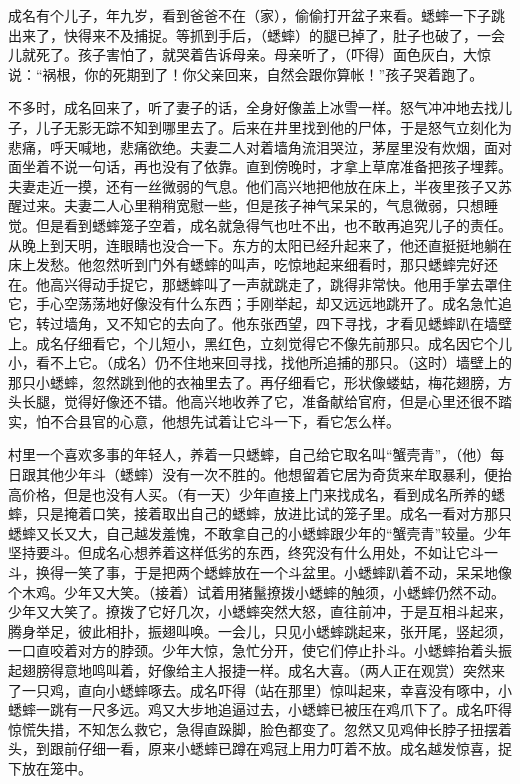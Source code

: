 \documentclass[12pt,UTF-8,openany]{ctexbook}
\begin{document}
\begin{normalsize}
    成名有个儿子，年九岁，看到爸爸不在（家），偷偷打开盆子来看。蟋蟀一下子跳出来了，快得来不及捕捉。等抓到手后，（蟋蟀）的腿已掉了，肚子也破了，一会儿就死了。孩子害怕了，就哭着告诉母亲。母亲听了，（吓得）面色灰白，大惊说：“祸根，你的死期到了！你父亲回来，自然会跟你算帐！”孩子哭着跑了。
    
    不多时，成名回来了，听了妻子的话，全身好像盖上冰雪一样。怒气冲冲地去找儿子，儿子无影无踪不知到哪里去了。后来在井里找到他的尸体，于是怒气立刻化为悲痛，呼天喊地，悲痛欲绝。夫妻二人对着墙角流泪哭泣，茅屋里没有炊烟，面对面坐着不说一句话，再也没有了依靠。直到傍晚时，才拿上草席准备把孩子埋葬。夫妻走近一摸，还有一丝微弱的气息。他们高兴地把他放在床上，半夜里孩子又苏醒过来。夫妻二人心里稍稍宽慰一些，但是孩子神气呆呆的，气息微弱，只想睡觉。但是看到蟋蟀笼子空着，成名就急得气也吐不出，也不敢再追究儿子的责任。从晚上到天明，连眼睛也没合一下。东方的太阳已经升起来了，他还直挺挺地躺在床上发愁。他忽然听到门外有蟋蟀的叫声，吃惊地起来细看时，那只蟋蟀完好还在。他高兴得动手捉它，那蟋蟀叫了一声就跳走了，跳得非常快。他用手掌去罩住它，手心空荡荡地好像没有什么东西；手刚举起，却又远远地跳开了。成名急忙追它，转过墙角，又不知它的去向了。他东张西望，四下寻找，才看见蟋蟀趴在墙壁上。成名仔细看它，个儿短小，黑红色，立刻觉得它不像先前那只。成名因它个儿小，看不上它。（成名）仍不住地来回寻找，找他所追捕的那只。（这时）墙壁上的那只小蟋蟀，忽然跳到他的衣袖里去了。再仔细看它，形状像蝼蛄，梅花翅膀，方头长腿，觉得好像还不错。他高兴地收养了它，准备献给官府，但是心里还很不踏实，怕不合县官的心意，他想先试着让它斗一下，看它怎么样。
    
    村里一个喜欢多事的年轻人，养着一只蟋蟀，自己给它取名叫“蟹壳青”，（他）每日跟其他少年斗（蟋蟀）没有一次不胜的。他想留着它居为奇货来牟取暴利，便抬高价格，但是也没有人买。（有一天）少年直接上门来找成名，看到成名所养的蟋蟀，只是掩着口笑，接着取出自己的蟋蟀，放进比试的笼子里。成名一看对方那只蟋蟀又长又大，自己越发羞愧，不敢拿自己的小蟋蟀跟少年的“蟹壳青”较量。少年坚持要斗。但成名心想养着这样低劣的东西，终究没有什么用处，不如让它斗一斗，换得一笑了事，于是把两个蟋蟀放在一个斗盆里。小蟋蟀趴着不动，呆呆地像个木鸡。少年又大笑。（接着）试着用猪鬣撩拨小蟋蟀的触须，小蟋蟀仍然不动。少年又大笑了。撩拨了它好几次，小蟋蟀突然大怒，直往前冲，于是互相斗起来，腾身举足，彼此相扑，振翅叫唤。一会儿，只见小蟋蟀跳起来，张开尾，竖起须，一口直咬着对方的脖颈。少年大惊，急忙分开，使它们停止扑斗。小蟋蟀抬着头振起翅膀得意地鸣叫着，好像给主人报捷一样。成名大喜。（两人正在观赏）突然来了一只鸡，直向小蟋蟀啄去。成名吓得（站在那里）惊叫起来，幸喜没有啄中，小蟋蟀一跳有一尺多远。鸡又大步地追逼过去，小蟋蟀已被压在鸡爪下了。成名吓得惊慌失措，不知怎么救它，急得直跺脚，脸色都变了。忽然又见鸡伸长脖子扭摆着头，到跟前仔细一看，原来小蟋蟀已蹲在鸡冠上用力叮着不放。成名越发惊喜，捉下放在笼中。
    

\end{normalsize}
\end{document}
